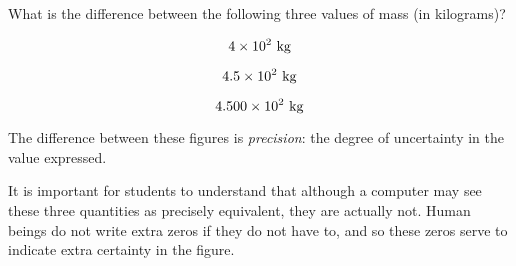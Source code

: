

What is the difference between the following three values of mass (in kilograms)?

$$4 \times 10^2 \hbox{ kg}$$

$$4.5 \times 10^2 \hbox{ kg}$$

$$4.500 \times 10^2 \hbox{ kg}$$







The difference between these figures is {\it precision}: the degree of uncertainty in the value expressed.







It is important for students to understand that although a computer may see these three quantities as precisely equivalent, they are actually not.  Human beings do not write extra zeros if they do not have to, and so these zeros serve to indicate extra certainty in the figure.




